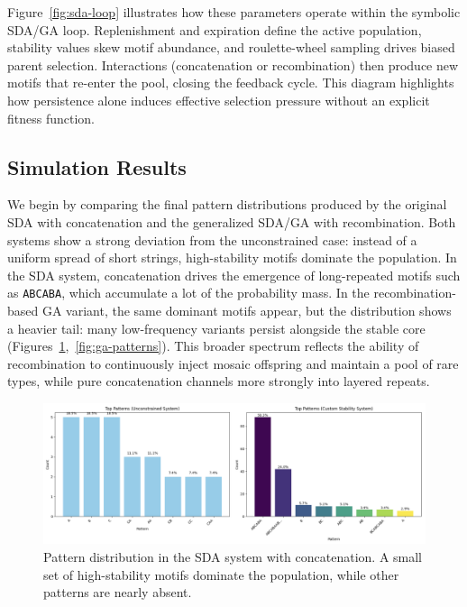 \documentclass[life,article,submit,pdftex,moreauthors]{Definitions/mdpi}
\begin{document}
Figure~\ref{fig:sda-loop} illustrates how these parameters operate within the
symbolic SDA/GA loop. Replenishment and expiration define the active population, 
stability values skew motif abundance, and roulette-wheel sampling drives
biased parent selection. Interactions (concatenation or recombination) then
produce new motifs that re-enter the pool, closing the feedback cycle. 
This diagram highlights how persistence alone induces effective selection
pressure without an explicit fitness function.

\subsection{Simulation Results}

We begin by comparing the final pattern distributions produced by the original SDA with concatenation and the generalized SDA/GA with recombination. Both systems show a strong deviation from the unconstrained case: instead of a uniform spread of short strings, high-stability motifs dominate the population. In the SDA system, concatenation drives the emergence of long-repeated motifs such as \texttt{ABCABA}, which accumulate a lot of the probability mass. In the recombination-based GA variant, the same dominant motifs appear, but the distribution shows a heavier tail: many low-frequency variants persist alongside the stable core (Figures~\ref{fig:concat-patterns},~\ref{fig:ga-patterns}). This broader spectrum reflects the ability of recombination to continuously inject mosaic offspring and maintain a pool of rare types, while pure concatenation channels more strongly into layered repeats.

\begin{figure}[H]
    \centering
    \includegraphics[width=1\textwidth]{SDA-concat-patterns.png}
    \caption{Pattern distribution in the SDA system with concatenation. A small set of high-stability motifs dominate the population, while other patterns are nearly absent.}
    \label{fig:concat-patterns}
\end{figure}
\end{document}
